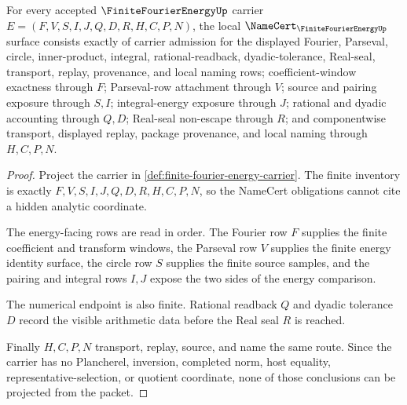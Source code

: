 \begin{theorem}
\label{thm:finite-fourier-energy-namecert-obligations}
For every accepted $\FiniteFourierEnergyUp$ carrier $E=(F,V,S,I,J,Q,D,R,H,C,P,N)$, the local $\NameCert_{\FiniteFourierEnergyUp}$ surface consists exactly of carrier admission for the displayed Fourier, Parseval, circle, inner-product, integral, rational-readback, dyadic-tolerance, Real-seal, transport, replay, provenance, and local naming rows; coefficient-window exactness through $F$; Parseval-row attachment through $V$; source and pairing exposure through $S,I$; integral-energy exposure through $J$; rational and dyadic accounting through $Q,D$; Real-seal non-escape through $R$; and componentwise transport, displayed replay, package provenance, and local naming through $H,C,P,N$.
\end{theorem}
\begin{proof}
Project the carrier in \autoref{def:finite-fourier-energy-carrier}. The finite inventory is exactly $F,V,S,I,J,Q,D,R,H,C,P,N$, so the NameCert obligations cannot cite a hidden analytic coordinate.

The energy-facing rows are read in order. The Fourier row $F$ supplies the finite coefficient and transform windows, the Parseval row $V$ supplies the finite energy identity surface, the circle row $S$ supplies the finite source samples, and the pairing and integral rows $I,J$ expose the two sides of the energy comparison.

The numerical endpoint is also finite. Rational readback $Q$ and dyadic tolerance $D$ record the visible arithmetic data before the Real seal $R$ is reached.

Finally $H,C,P,N$ transport, replay, source, and name the same route. Since the carrier has no Plancherel, inversion, completed norm, host equality, representative-selection, or quotient coordinate, none of those conclusions can be projected from the packet.
\end{proof}

